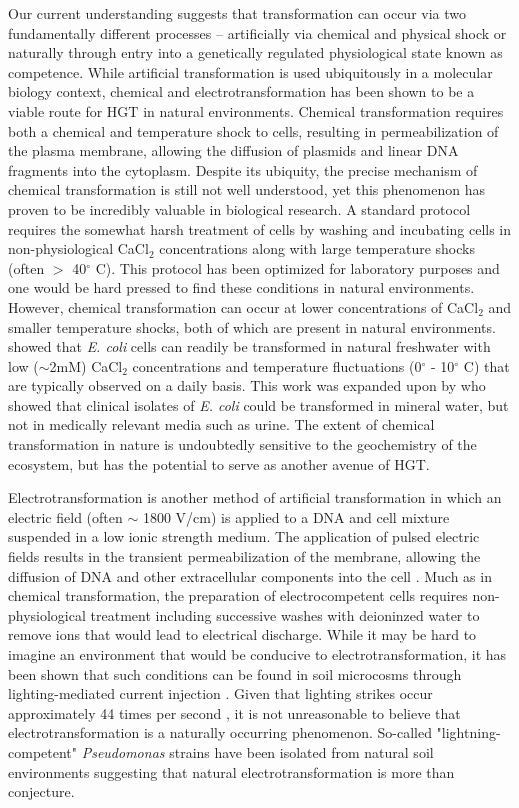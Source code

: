 Our current understanding suggests that transformation can occur via two
fundamentally different processes -- artificially via chemical and physical
shock or naturally through entry into a genetically regulated physiological
state known as competence. While artificial transformation is used ubiquitously
in a molecular biology context, chemical and electrotransformation has been
shown to be a viable route for HGT in natural environments. Chemical
transformation requires both a chemical and temperature shock to cells,
resulting in permeabilization of the plasma membrane, allowing the diffusion of
plasmids and linear DNA fragments into the cytoplasm. Despite its ubiquity, the
precise mechanism of chemical transformation is still not well understood, yet this
phenomenon has proven to be incredibly valuable in  biological research.  A
standard protocol requires the somewhat harsh treatment of cells by washing and
incubating cells in non-physiological CaCl$_2$ concentrations along with large
temperature shocks (often $>$ 40$^\circ$ C). This protocol has been optimized
for laboratory purposes and one would be hard pressed to find these conditions
in natural environments.  However, chemical transformation can occur at lower
concentrations of CaCl$_2$ and smaller temperature shocks, both of which are
present in natural environments. \citet{Baur:2006ba} showed that \textit{E.
coli} cells can readily be transformed in natural freshwater with low
($\sim$2mM) CaCl$_2$ concentrations and temperature fluctuations (0$^\circ$ -
10$^\circ$ C) that are typically observed on a daily basis. This work was
expanded upon by \citet{Woegerbauer:2002ev} who showed that clinical isolates of
\textit{E. coli} could be transformed in mineral water, but not in medically
relevant media such as urine. The extent of chemical transformation in nature is
undoubtedly sensitive to the geochemistry of the ecosystem, but has the
potential to serve as another avenue of HGT.

Electrotransformation is another method of artificial transformation in which
an  electric field (often $\sim$ 1800 V/cm) is applied to a DNA
and cell mixture suspended in a low ionic strength medium. The application of
pulsed electric fields results in the transient permeabilization of the membrane,
allowing the diffusion of DNA and other extracellular components into the
cell \cite{Wegner:2015fx}. Much as in chemical transformation, the preparation of
electrocompetent cells requires non-physiological treatment including successive
washes with deioninzed water to remove ions that would lead to electrical
discharge. While it may be hard to imagine an environment that would be
conducive to electrotransformation, it has been shown that such conditions can
be found in soil microcosms through lighting-mediated current
injection \cite{Demaneche:2001kb}. Given that lighting strikes occur 
approximately 44 times per second \cite{NOAAlighting}, it is not unreasonable to
believe that electrotransformation is a naturally occurring phenomenon.
So-called "lightning-competent" \textit{Pseudomonas} strains have been isolated
from natural soil environments \cite{Ceremonie:2004gr} suggesting that natural
electrotransformation is more than conjecture.


